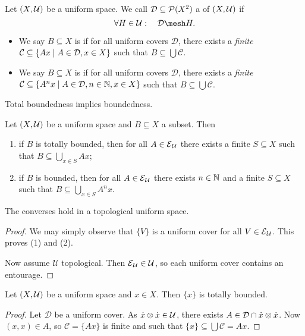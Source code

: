 \begin{definition}
Let $\left( X,\mathcal{U} \right)$ be a uniform space. We call $\mathcal{D} \subseteq \operatorname{\mathcal{P}}(X^2)$ a  of $\left( X,\mathcal{U} \right)$ if
\[ \forall H\in \mathcal{U}:\quad \mathcal{D}\mesh H. \]
\begin{itemize}
\item We say $B\subseteq X$ is  if for all uniform covers $\mathcal{D}$, there exists a \emph{finite} $\mathcal{C} \subseteq \left\{ Ax \;\middle|\; A\in \mathcal{D}, x\in X \right\}$ such that $B\subseteq \bigcup \mathcal{C}$.
\item We say $B\subseteq X$ is  if for all uniform covers $\mathcal{D}$, there exists a \emph{finite} $\mathcal{C} \subseteq \left\{ A^nx \;\middle|\; A\in \mathcal{D}, n\in \mathbb{N}, x\in X \right\}$ such that $B\subseteq \bigcup \mathcal{C}$.
\end{itemize}
\end{definition}

\begin{lemma}
Total boundedness implies boundedness.
\end{lemma}

\begin{lemma} \label{topologicalBoundednessLemma}
Let $\left( X,\mathcal{U} \right)$ be a uniform space and $B\subseteq X$ a subset. Then
\begin{enumerate}
\item if $B$ is totally bounded, then for all $A\in \operatorname{\mathcal{E}}_\mathcal{U}$ there exists a finite $S\subseteq X$ such that $B\subseteq \bigcup_{x\in S}Ax$;
\item if $B$ is bounded, then for all $A\in \operatorname{\mathcal{E}}_\mathcal{U}$ there exists $n\in \mathbb{N}$ and a finite $S\subseteq X$ such that $B\subseteq \bigcup_{x\in S}A^nx$.
\end{enumerate}
The converses hold in a topological uniform space.
\end{lemma}
\begin{proof}
We may simply observe that $\{V\}$ is a uniform cover for all $V\in \operatorname{\mathcal{E}}_\mathcal{U}$. This proves (1) and (2).

Now assume $\mathcal{U}$ topological. Then $\operatorname{\mathcal{E}}_\mathcal{U} \in \mathcal{U}$, so each uniform cover contains an entourage. 
\end{proof}

\begin{lemma} \label{singletonsTotallyBounded}
Let $\left( X,\mathcal{U} \right)$ be a uniform space and $x\in X$. Then $\{x\}$ is totally bounded.
\end{lemma}
\begin{proof}
Let $\mathcal{D}$ be a uniform cover. As $\dot{x}\otimes \dot{x}\in \mathcal{U}$, there exists $A\in \mathcal{D} \cap \dot{x}\otimes \dot{x}$. Now $(x,x)\in A$, so $\mathcal{C} = \{Ax\}$ is finite and such that $\{x\} \subseteq \bigcup \mathcal{C} = Ax$.
\end{proof}

